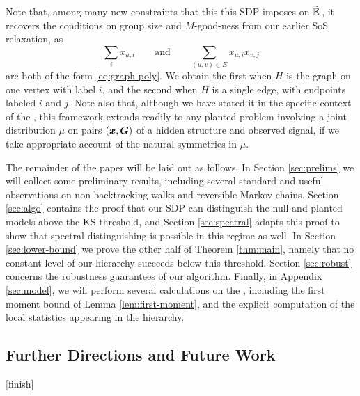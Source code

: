 Note that, among many new constraints that this this SDP imposes on $\widetilde{\operatorname*{\mathbb{E}}}\,$, it recovers the conditions on group size and $M$-good-ness from our earlier SoS relaxation, as
$$
	\sum_i x_{u,i}\qquad \text{and} \qquad \sum_{(u,v)\in E} x_{u,i}x_{v,j}
$$
are both of the form \eqref{eq:graph-poly}. We obtain the first when $H$ is the graph on one vertex with label $i$, and the second when $H$ is a single edge, with endpoints labeled $i$ and $j$. Note also that, although we have stated it in the specific context of the \model, this framework extends readily to any planted problem involving a joint distribution $\mu$ on pairs $({\boldsymbol{x}},\boldsymbol{G})$ of a hidden structure and observed signal, if we take appropriate account of the natural symmetries in $\mu$.

The remainder of the paper will be laid out as follows. In Section \ref{sec:prelims} we will collect some preliminary results, including several standard and useful observations on non-backtracking walks and reversible Markov chains. Section \ref{sec:algo} contains the proof that our SDP can distinguish the null and planted models above the KS threshold, and Section \ref{sec:spectral} adapts this proof to show that spectral distinguishing is possible in this regime as well. In Section \ref{sec:lower-bound} we prove the other half of Theorem \ref{thm:main}, namely that no constant level of our hierarchy succeeds below this threshold. Section \ref{sec:robust} concerns the robustness guarantees of our algorithm. Finally, in Appendix \ref{sec:model}, we will perform several calculations on the \model, including the first moment bound of Lemma \ref{lem:first-moment}, and the explicit computation of the local statistics appearing in the  hierarchy.


\subsection{Further Directions and Future Work} %
\label{sub:further_directions_and_future_work}

[finish]






